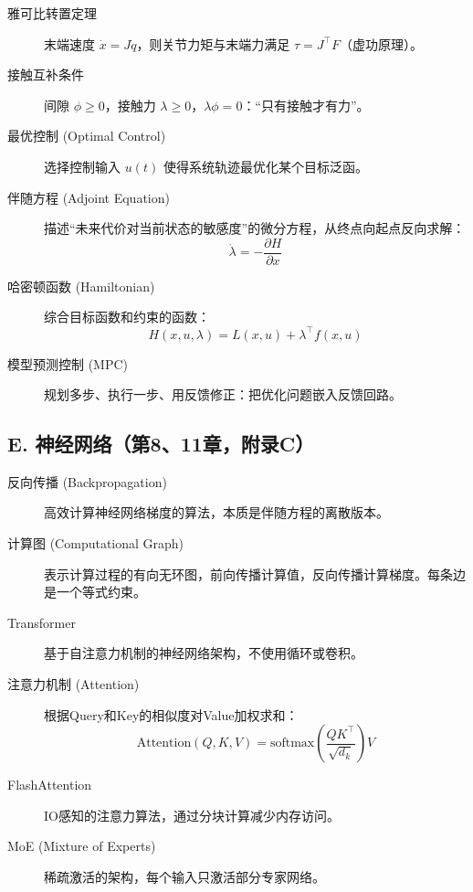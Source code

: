 \begin{description}
    \item[雅可比转置定理]
    末端速度 $\dot x = J\dot q$，则关节力矩与末端力满足 $\tau = J^\top F$（虚功原理）。

    \item[接触互补条件]
    间隙 $\phi \ge 0$，接触力 $\lambda \ge 0$，$\lambda\phi = 0$：“只有接触才有力”。

    \item[最优控制 (Optimal Control)]
    选择控制输入 $u(t)$ 使得系统轨迹最优化某个目标泛函。

    \item[伴随方程 (Adjoint Equation)]
    描述“未来代价对当前状态的敏感度”的微分方程，从终点向起点反向求解：
    \[
    \dot{\lambda} = -\frac{\partial H}{\partial x}
    \]

    \item[哈密顿函数 (Hamiltonian)]
    综合目标函数和约束的函数：
    \[
    H(x, u, \lambda) = L(x, u) + \lambda^\top f(x, u)
    \]

    \item[模型预测控制 (MPC)]
    规划多步、执行一步、用反馈修正：把优化问题嵌入反馈回路。
\end{description}

\subsection*{E. 神经网络（第8、11章，附录C）}

\begin{description}
    \item[反向传播 (Backpropagation)]
    高效计算神经网络梯度的算法，本质是伴随方程的离散版本。

    \item[计算图 (Computational Graph)]
    表示计算过程的有向无环图，前向传播计算值，反向传播计算梯度。每条边是一个等式约束。

    \item[Transformer]
    基于自注意力机制的神经网络架构，不使用循环或卷积。

    \item[注意力机制 (Attention)]
    根据Query和Key的相似度对Value加权求和：
    \[
    \text{Attention}(Q, K, V) = \text{softmax}\left(\frac{QK^\top}{\sqrt{d_k}}\right) V
    \]

    \item[FlashAttention]
    IO感知的注意力算法，通过分块计算减少内存访问。

    \item[MoE (Mixture of Experts)]
    稀疏激活的架构，每个输入只激活部分专家网络。
\end{description}

